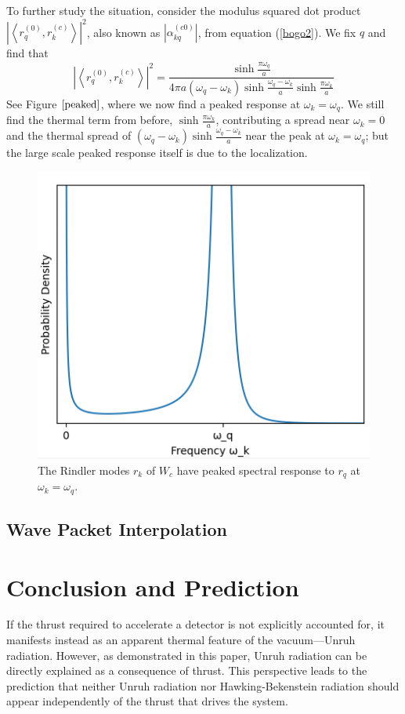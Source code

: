 \documentclass[12pt,a4paper]{article}
\begin{document}
To further study the situation, consider the modulus squared dot product $\left|\left<r_q^{(0)}, r_k^{(c)} \right>\right|^2$, also known as $\left|\alpha^{(c0)}_{kq}\right|$, from equation (\ref{bogo2}).  We fix $q$ and find that
\begin{equation}
  \left|\left<r_q^{(0)}, r_k^{(c)} \right>\right|^2 = \frac{\sinh \frac{\pi \omega_q}{a}}{4\pi a (\omega_q - \omega_k) \sinh \frac{\omega_q - \omega_k}{a} \sinh \frac{\pi \omega_k}{a}}
\end{equation}
See Figure $\ref{peaked}$, where we now find a peaked response at $\omega_k = \omega_q$.  We still find the thermal term from before, $\sinh \frac{\pi \omega_k}{a}$, contributing a spread near $\omega_k = 0$ and the thermal spread of $(\omega_q - \omega_k) \sinh \frac{\omega_q - \omega_k}{a}$ near the peak at $\omega_k = \omega_q$; but the large scale peaked response itself is due to the localization.

\begin{figure}[h]
  \centering
\includegraphics[scale=0.6]{peaked.png}
\caption{The Rindler modes $r_k$ of $W_c$ have peaked spectral response to $r_q$ at $\omega_k = \omega_q$.}
\label{peaked}
\end{figure}

\subsection{Wave Packet Interpolation}

\section{Conclusion and Prediction}
If the thrust required to accelerate a detector is not explicitly accounted for, it manifests instead as an apparent thermal feature of the vacuum—Unruh radiation. However, as demonstrated in this paper, Unruh radiation can be directly explained as a consequence of thrust. This perspective leads to the prediction that neither Unruh radiation nor Hawking-Bekenstein radiation should appear independently of the thrust that drives the system.
\end{document}
